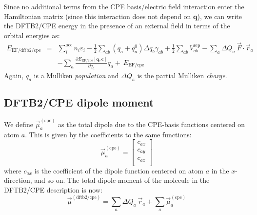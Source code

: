\documentclass{article}
\numberwithin{equation}{section}
\begin{document}
\\\\Since no additional terms from the CPE basis/electric field interaction enter the Hamiltonian matrix (since this interaction does not depend on $\mathbf{q}$), we can write the DFTB2/CPE energy in the presence of an external field in terms of the orbital energies as:
\begin{eqnarray}
    E_\mathrm{EF/dftb2/cpe}  
    &=& \sum_i^\mathrm{occ} n_i \varepsilon_i - \frac{1}{2}\sum_{ab} \left(q_a + q_a^0 \right)\Delta q_b \gamma_{ab} + \frac{1}{2} \sum_{ab} V^\mathrm{rep}_{ab} -\sum_a \Delta Q_a\ \vec{F} \cdot \vec{r}_a\nonumber\\
    && - \sum_a  \frac{\partial E_{\mathrm{EF/cpe}}\left[\mathbf{q}, \mathbf{c}\right]}{\partial q_a} q_a +\ E_{\mathrm{EF/cpe}}
\end{eqnarray}
Again, $q_a$ is a Mulliken \textit{population} and $\Delta Q_a$ is the partial Mulliken \textit{charge}.

\subsection{DFTB2/CPE dipole moment}
We define $\vec{\mu}^{\mathrm{(cpe)}}_a$ as the total dipole due to the CPE-basis functions centered on atom $a$. This is given by the coefficients to the same functions:
\begin{equation}
    \vec{\mu}^{\mathrm{(cpe)}}_a =  
    \begin{bmatrix}
        c_{ax}\\
        c_{ay}\\
        c_{az}\\
    \end{bmatrix}
\end{equation}
where $c_{ax}$ is the coefficient of the dipole function centered on atom $a$ in the $x$-direction, and so on.
The total dipole-moment of the molecule in the DFTB2/CPE description is now:
\begin{equation}
    \vec{\mu}^{\mathrm{(dftb2/cpe)}} = \sum_a \Delta Q_a\ \vec{r}_a + \sum_a \vec{\mu}^{\mathrm{(cpe)}}_a
\end{equation}
\end{document}

